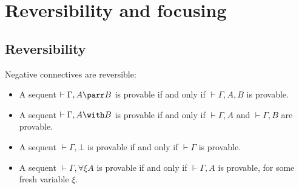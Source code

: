 \section{Reversibility and focusing}\label{reversibility-and-focusing}

\subsection{Reversibility}\label{reversibility}

\begin{theorem}
Negative connectives are reversible:
\begin{itemize}
\item A sequent $\vdash\Gamma,A\parr B$ is provable if and only if $\vdash\Gamma,A,B$ is provable.
\item A sequent $\vdash\Gamma,A\with B$ is provable if and only if $\vdash\Gamma,A$ and $\vdash\Gamma,B$ are provable.
\item A sequent $\vdash\Gamma,\bot$ is provable if and only if $\vdash\Gamma$ is provable.
\item A sequent $\vdash\Gamma,\forall\xi A$ is provable if and only if $\vdash\Gamma,A$ is provable, for some fresh variable $\xi$.
\end{itemize}
\end{theorem}

